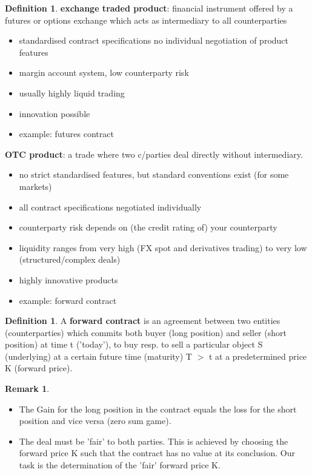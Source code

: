 \documentclass[10pt, oneside, reqno]{amsbook}
\theoremstyle{plain}%
\theoremstyle{definition}
\theoremstyle{rem}
\newtheorem*{rem}{Remark}
\theoremstyle{definition}
\newtheorem{dfn}[thm]{Definition}
\newcommand{\gt}{>}
\numberwithin{equation}{chapter}
\begin{document}
\begin{dfn}
\textbf{exchange traded product}: financial instrument offered by a futures or options
exchange which acts as intermediary to all counterparties
\begin{itemize}
\item standardised contract specifications
 no individual negotiation of product features
\item margin account system, low counterparty risk
\item usually highly liquid trading
\item innovation possible
\item example: futures contract
\end{itemize}
\textbf{OTC product}: a trade where two c/parties deal directly without intermediary.
\begin{itemize}
\item no strict standardised features, but standard conventions exist (for some markets)
\item all contract specifications negotiated individually
\item  counterparty risk depends on (the credit rating of) your counterparty
\item liquidity ranges from very high (FX spot and derivatives trading) to very low
(structured/complex deals)
\item highly innovative products
\item  example: forward contract
\end{itemize}
\end{dfn}

\begin{dfn}
 A \textbf{forward contract} is an agreement between two entities (counterparties) which
commits both buyer (long position) and seller (short position) at time t ('today'),
to buy resp. to sell a particular object S (underlying) at a certain future time
(maturity) T $\gt$ t at a predetermined price K (forward price).
\end{dfn}

\begin{rem}
\begin{itemize}
 \item The Gain for the long position in the contract equals the loss for the short
position and vice versa (zero sum game).
\item The deal must be 'fair' to both parties. This is achieved by choosing the
forward price K such that the contract has no value at its conclusion. Our
task is the determination of the 'fair' forward price K.
\end{itemize}
\end{rem}
\end{document}
